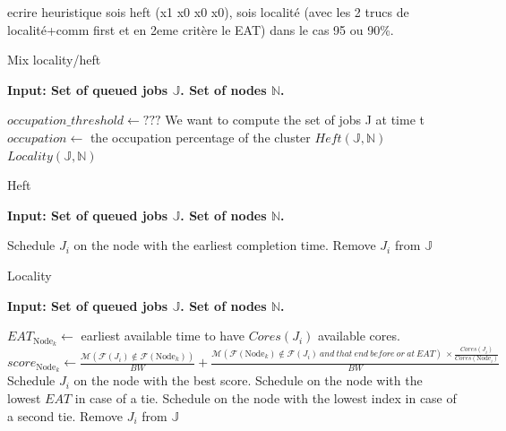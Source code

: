 \documentclass[a4paper]{article}
\newcommand{\Node}[1]{\ensuremath{\mathrm{Node}_{#1}}\xspace}
\newcommand{\inputs}{\ensuremath{\mathcal{F}}\xspace}
\newcommand{\memory}{\ensuremath{\mathcal{M}}\xspace}
\newcommand{\bandwidth}{\mathit{BW}\xspace}
\newcommand{\core}{\mathit{Cores}\xspace}
\newcommand{\jobset}{\ensuremath{\mathbb{J}}\xspace}
\newcommand{\nodeset}{\ensuremath{\mathbb{N}}\xspace}
\begin{document}
ecrire heuristique sois heft (x1 x0 x0 x0), sois localité (avec les 2 trucs de localité+comm first et en 2eme critère le EAT) dans le cas 95 ou 90\%.
\begin{algorithm}[htbp]
\caption{Mix locality/heft}
\hspace*{\algorithmicindent} \textbf{Input: Set of queued jobs $\jobset$. Set of nodes $\nodeset$.} \\
\begin{algorithmic}[0]
\State $occupation\_threshold \gets ???$
\State We want to compute the set of jobs J at time t
\State $occupation \gets$ the occupation percentage of the cluster 
	\State $Heft(\jobset,\nodeset)$
\Else
	\State $Locality(\jobset,\nodeset)$
\EndIf
\end{algorithmic}
\end{algorithm}

\begin{algorithm}[htbp]
\caption{Heft}
\hspace*{\algorithmicindent} \textbf{Input: Set of queued jobs $\jobset$. Set of nodes $\nodeset$.} \\
\begin{algorithmic}[0]
\ForEach {$J_i \in \jobset$}
	\State Schedule $J_i$ on the node with the earliest completion time. 
	\State Remove $J_i$ from $\jobset$
\EndFor
\end{algorithmic}
\end{algorithm}

\begin{algorithm}[htbp]
\caption{Locality}
\hspace*{\algorithmicindent} \textbf{Input: Set of queued jobs $\jobset$. Set of nodes $\nodeset$.} \\
\begin{algorithmic}[0]
\ForEach {$J_i \in \jobset$}
	\ForEach {$\Node{k} \in \nodeset$}
		\State $EAT_{\Node{k}} \gets$ earliest available time to have $\core(J_i)$ available cores.
		\State $score_{\Node{k}} \gets \frac{\memory(\inputs(J_i) \notin \inputs(\Node{k}))}{\bandwidth} + \frac{\memory(\inputs(\Node{k}) \notin \inputs(J_i)~and~that~end~before~or~at~EAT)~ \times \frac{\core(J_i)}{\core(\Node{i})}}{\bandwidth}$
	\EndFor
	\State Schedule $J_i$ on the node with the best score. Schedule on the node with the lowest $EAT$ in case of a tie. Schedule on the node with the lowest index in case of a second tie. 
	\State Remove $J_i$ from $\jobset$
\EndFor
\end{algorithmic}
\end{algorithm}
\end{document}
